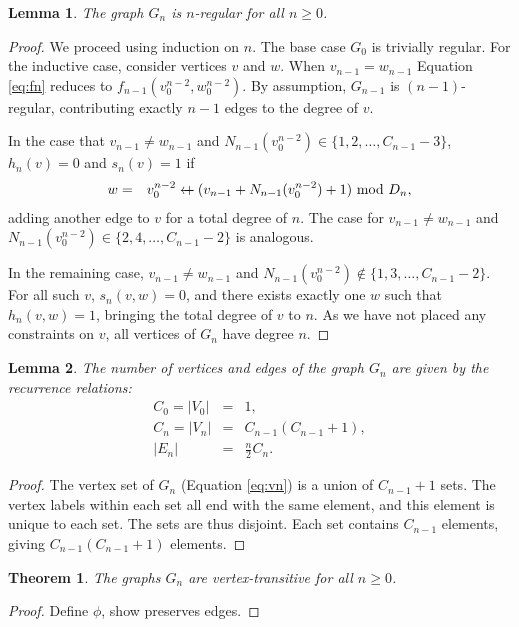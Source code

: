 \documentclass{article}
\newcommand{\beq}{\begin{eqnarray}}
\newcommand{\eeq}{\end{eqnarray}}
\newcommand{\append}{\leftarrow{\mkern-18mu}{+}\:}
\newtheorem{lemma}{Lemma}
\newtheorem{theorem}{Theorem}
\begin{document}
\begin{lemma}
The graph $G_n$ is $n$-regular for all $n \geq 0$.
\end{lemma}
\begin{proof}
We proceed using induction on $n$.
The base case $G_0$ is trivially regular.
For the inductive case, consider vertices $v$ and $w$.
When $v_{n-1} = w_{n-1}$
Equation \ref{eq:fn} reduces to $f_{n-1}(v_0^{n-2},w_0^{n-2})$.
By assumption, $G_{n-1}$ is $(n-1)$-regular, contributing exactly
$n-1$ edges to the degree of $v$.

In the case that $v_{n-1} \neq w_{n-1}$ and
$N_{n-1}(v_0^{n-2}) \in \{ 1, 2, \ldots, C_{n-1} - 3\}$,
$h_n(v) = 0$ and $s_n(v) = 1$ if
\beq
w &=& v_0^{n-2} \append (v_{n-1} + N_{n-1}(v_0^{n-2}) + 1) \ \mbox{mod } D_n,
\eeq
adding another edge to $v$ for a total degree of $n$.
The case for $v_{n-1} \neq w_{n-1}$ and
$N_{n-1}(v_0^{n-2}) \in \{ 2, 4, \ldots, C_{n-1} -2 \}$ is analogous.

In the remaining case, $v_{n-1} \neq w_{n-1}$ and
$N_{n-1}(v_0^{n-2}) \not\in \{ 1, 3, \ldots, C_{n-1} - 2 \}$.
For all such $v$, $s_n(v,w) = 0$, and
there exists exactly one $w$ such that $h_n(v,w) = 1$, bringing the total
degree of $v$ to $n$.
As we have not placed any constraints on $v$, all vertices of
$G_n$ have degree $n$.
\end{proof}

\begin{lemma}
The number of vertices and edges of the graph $G_n$ are given by the recurrence
relations:
\beq
C_0 = |V_0| &=& 1, \\
\label{eq:cnrec}C_{n} = |V_{n}| &=& C_{n-1} (C_{n-1} + 1), \\
|E_n| &=& \frac{n}{2} C_n.
\eeq
\end{lemma}
\begin{proof}
The vertex set of $G_n$ (Equation \ref{eq:vn}) is a union of
$C_{n-1} + 1$ sets.
The vertex labels within each set all end with the same element,
and this element is unique to each set.
The sets are thus disjoint.
Each set contains $C_{n-1}$ elements, giving $C_{n-1}(C_{n-1} + 1)$
elements.

\end{proof}

\begin{theorem}
The graphs $G_n$ are vertex-transitive for all $n \geq 0$.
\end{theorem}
\begin{proof}
Define $\phi$, show preserves edges.
\end{proof}



\end{document}
